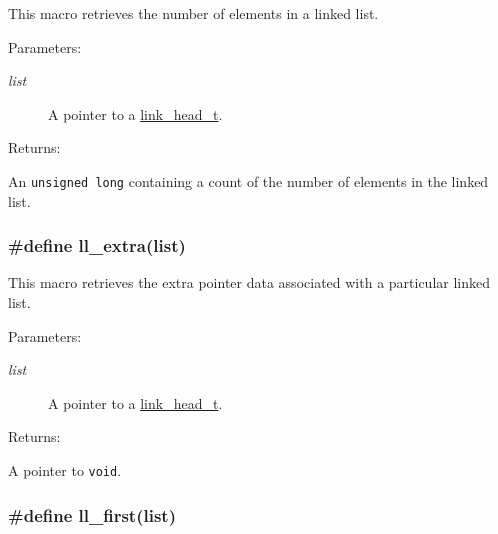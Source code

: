 This macro retrieves the number of elements in a linked list.\begin{Desc}
\item[Parameters: ]\par
\begin{description}
\item[{\em 
list}]A pointer to a \hyperlink{group__dbprim__link_a0}{link\_\-head\_\-t}.\end{description}
\end{Desc}
\begin{Desc}
\item[Returns: ]\par
An {\tt unsigned long} containing a count of the number of elements in the linked list. \end{Desc}
\hypertarget{group__dbprim__link_a18}{
\subsubsection[ll\_\-extra]{\setlength{\rightskip}{0pt plus 5cm}\#define ll\_\-extra(list)}}
\label{group__dbprim__link_a18}


This macro retrieves the extra pointer data associated with a particular linked list.\begin{Desc}
\item[Parameters: ]\par
\begin{description}
\item[{\em 
list}]A pointer to a \hyperlink{group__dbprim__link_a0}{link\_\-head\_\-t}.\end{description}
\end{Desc}
\begin{Desc}
\item[Returns: ]\par
A pointer to {\tt void}. \end{Desc}
\hypertarget{group__dbprim__link_a16}{
\subsubsection[ll\_\-first]{\setlength{\rightskip}{0pt plus 5cm}\#define ll\_\-first(list)}}
\label{group__dbprim__link_a16}


